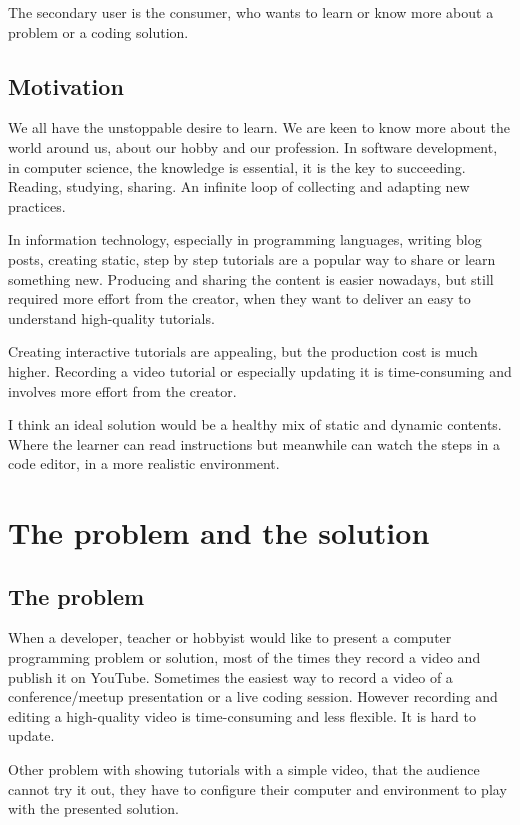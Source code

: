 \documentclass[11pt
              , a4paper
              , twoside
              , openright
              ]{report}
\begin{document}
The secondary user is the consumer, who wants to learn or know more about a problem or a coding solution.

\section{Motivation}

We all have the unstoppable desire to learn. We are keen to know more about the world around us, about our hobby and our profession. In software development, in computer science, the knowledge is essential, it is the key to succeeding. Reading, studying, sharing. An infinite loop of collecting and adapting new practices.

In information technology, especially in programming languages, writing blog posts, creating static, step by step tutorials are a popular way to share or learn something new. Producing and sharing the content is easier nowadays, but still required more effort from the creator, when they want to deliver an easy to understand high-quality tutorials.

Creating interactive tutorials are appealing, but the production cost is much higher. Recording a video tutorial or especially updating it is time-consuming and involves more effort from the creator.

I think an ideal solution would be a healthy mix of static and dynamic contents. Where the learner can read instructions but meanwhile can watch the steps in a code editor, in a more realistic environment.

\chapter{The problem and the solution}

\section{The problem}

When a developer, teacher or hobbyist would like to present a computer programming problem or solution, most of the times they record a video and publish it on YouTube. Sometimes the easiest way to record a video of a conference/meetup presentation or a live coding session. However recording and editing a high-quality video is time-consuming and less flexible. It is hard to update.

Other problem with showing tutorials with a simple video, that the audience cannot try it out, they have to configure their computer and environment to play with the presented solution.
\end{document}
